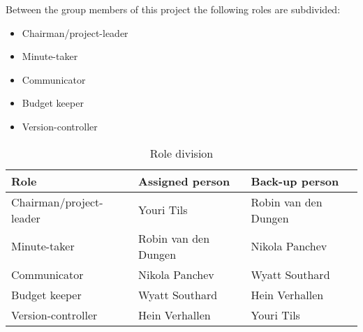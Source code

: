 Between the group members of this project the following roles are subdivided:
\begin{itemize}
    \setlength\itemsep{-0.3em}
    \item Chairman/project-leader
    \item Minute-taker
    \item Communicator
    \item Budget keeper
    \item Version-controller
\end{itemize}

\begin{table}[!h]
    \begin{tabular}{|l|l|l|}
        \hline
        \textbf{Role}           & \textbf{Assigned person}  & \textbf{Back-up person} \\ \hline
        Chairman/project-leader & Youri Tils                & Robin van den Dungen    \\ \hline
        Minute-taker            & Robin van den Dungen      & Nikola Panchev          \\ \hline
        Communicator            & Nikola Panchev            & Wyatt Southard          \\ \hline
        Budget keeper           & Wyatt Southard            & Hein Verhallen          \\ \hline
        Version-controller      & Hein Verhallen            & Youri Tils              \\ \hline
    \end{tabular}
    \caption{Role division}
\end{table}
